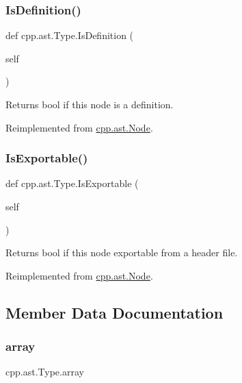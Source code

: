 \subsubsection{\texorpdfstring{IsDefinition()}{IsDefinition()}}
{\footnotesize\ttfamily def cpp.\+ast.\+Type.\+Is\+Definition (\begin{DoxyParamCaption}\item[{}]{self }\end{DoxyParamCaption})}

\begin{DoxyVerb}Returns bool if this node is a definition.\end{DoxyVerb}
 

Reimplemented from \mbox{\hyperlink{classcpp_1_1ast_1_1_node_a684ee9a357168e7e07a24fc6812f66e6}{cpp.\+ast.\+Node}}.

\mbox{\label{classcpp_1_1ast_1_1_type_a80dce781581c03e550ce51a9a33ca158}} 
\subsubsection{\texorpdfstring{IsExportable()}{IsExportable()}}
{\footnotesize\ttfamily def cpp.\+ast.\+Type.\+Is\+Exportable (\begin{DoxyParamCaption}\item[{}]{self }\end{DoxyParamCaption})}

\begin{DoxyVerb}Returns bool if this node exportable from a header file.\end{DoxyVerb}
 

Reimplemented from \mbox{\hyperlink{classcpp_1_1ast_1_1_node_a313273874ccf578485006d4000128234}{cpp.\+ast.\+Node}}.



\subsection{Member Data Documentation}
\mbox{\label{classcpp_1_1ast_1_1_type_a1fd0493e82da315bcb4c02b0cf2133a3}} 
\subsubsection{\texorpdfstring{array}{array}}
{\footnotesize\ttfamily cpp.\+ast.\+Type.\+array}


